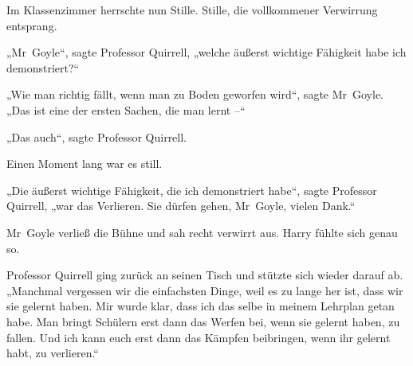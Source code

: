 Im Klassenzimmer herrschte nun Stille. Stille, die vollkommener Verwirrung entsprang.

„Mr~Goyle“, sagte Professor Quirrell, „welche äußerst wichtige Fähigkeit habe ich demonstriert?“

„Wie man richtig fällt, wenn man zu Boden geworfen wird“, sagte Mr~Goyle. „Das ist eine der ersten Sachen, die man lernt –“

„Das auch“, sagte Professor Quirrell.

Einen Moment lang war es still.

„Die äußerst wichtige Fähigkeit, die ich demonstriert habe“, sagte Professor Quirrell, „war das Verlieren. Sie dürfen gehen, Mr~Goyle, vielen Dank.“

Mr~Goyle verließ die Bühne und sah recht verwirrt aus. Harry fühlte sich genau so.

Professor Quirrell ging zurück an seinen Tisch und stützte sich wieder darauf ab. „Manchmal vergessen wir die einfachsten Dinge, weil es zu lange her ist, dass wir sie gelernt haben. Mir wurde klar, dass ich das selbe in meinem Lehrplan getan habe. Man bringt Schülern erst dann das Werfen bei, wenn sie gelernt haben, zu fallen. Und ich kann euch erst dann das Kämpfen beibringen, wenn ihr gelernt habt, zu verlieren.“

